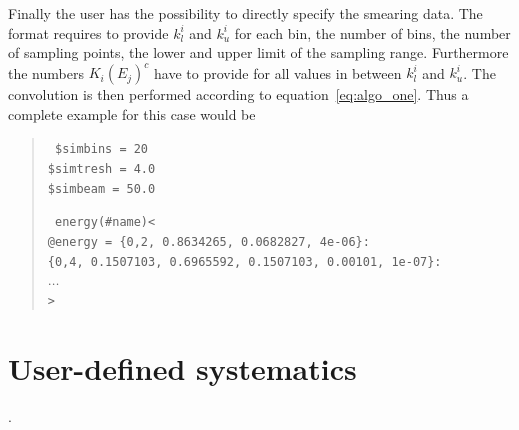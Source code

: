 Finally the user has the possibility to directly specify the smearing data.
The format requires to provide $k_l^i$ and $k_u^i$ for each bin, the number of
bins, the number of sampling points, the lower and upper limit of the sampling
range. Furthermore the numbers $K_i(E_j)^c$ have to provide for all values
in between $k_l^i$ and $k_u^i$. The convolution is then performed according to
equation~\ref{eq:algo_one}. Thus a complete example for this case would be
\begin{quote}
{\tt
\$simbins = 20\\
\$simtresh =          4.0\\
\$simbeam =         50.0\\
}

{\tt 
energy(\#name)<\\
\tb @energy =   \{0,2, 0.8634265, 0.0682827,     4e-06\}:\\
\tb\tb \{0,4, 0.1507103, 0.6965592, 0.1507103,   0.00101,     1e-07\}:\\
\tb\tb $\ldots$\\
>
}
\end{quote}
\section{User-defined systematics}
\label{sec:ud_error_dim}.


